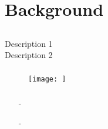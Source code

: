 
\chapter{Background}
\label{chp:background}

\section{}

\begin{description}
	\item[Description 1]
	\item[Description 2]
\end{description}

\subsection{}

\begin{figure}[htbp] %
   \centering
   \texttt{[image: ]} 
   \caption{}
   \label{}
\end{figure}

\subsection{}

\begin{itemize}
\item[-]
\item[-]
\end{itemize}

